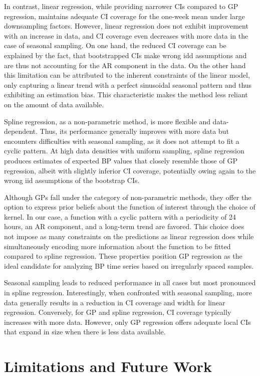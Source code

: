 In contrast, linear regression, while providing narrower CIs compared to GP regression,
maintains adequate CI coverage for the one-week mean under large downsampling factors.
However, linear regression does not exhibit improvement with an increase in data,
and CI coverage even decreases with more data in the case of seasonal sampling.
On one hand, the reduced CI coverage can be explained
by the fact, that bootstrapped CIs make wrong idd assumptions and are
thus not accounting
for the AR component in the data.
On the other hand this limitation can be attributed to the inherent constraints of the linear model,
only capturing a linear trend with a perfect sinusoidal seasonal pattern and thus
exhibiting an estimation bias.
This characteristic makes the method less reliant on the amount of data available.

Spline regression, as a non-parametric method, is more flexible and data-dependent.
Thus, its performance generally improves with more data but encounters
difficulties with seasonal sampling, as it does not attempt to fit a cyclic pattern.
At high data densities with uniform sampling, spline regression produces estimates
of expected BP values that closely resemble those of GP regression,
albeit with slightly inferior CI coverage, potentially owing again to the
wrong iid assumptions of the bootstrap CIs.

Although GPs fall under the category of non-parametric methods, they offer the option to express
prior beliefs about the function of interest through the choice of kernel.
In our case, a function with a cyclic pattern with a periodicity of 24 hours,
an AR component, and a long-term trend are favored.
This choice does not impose as many constraints on the predictions as linear regression does
while simultaneously encoding more information about the function
to be fitted compared to spline regression.
These properties position GP regression as the ideal candidate for analyzing
BP time series based on irregularly spaced samples.


Seasonal sampling leads to reduced performance in all
cases but most pronounced in spline regression.
Interestingly, when confronted with seasonal sampling, more data generally
results in a reduction in CI coverage and width for linear regression.
Conversely, for GP and spline regression, CI coverage typically increases
with more data.
However, only GP regression offers adequate local CIs that expand in size
when there is less data available.

\section{Limitations and Future Work}

